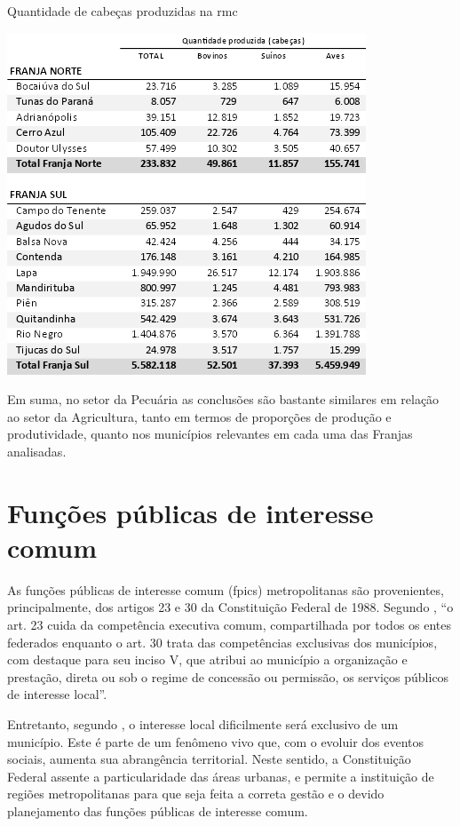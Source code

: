 	\begin{table}[h]
		\centering
		\caption{Quantidade de cabeças produzidas na \gls{rmc}}
		\includegraphics{img/rural_B}
		\label{tab:rural_B}
	\end{table}

	Em suma, no setor da Pecuária as conclusões são bastante similares em relação ao setor da Agricultura, tanto em termos de proporções de produção e produtividade, quanto nos municípios relevantes em cada uma das Franjas analisadas.

	\section{Funções públicas de interesse comum}
	
	As funções públicas de interesse comum (\gls{fpic}s) metropolitanas são provenientes, principalmente, dos artigos 23 e 30 da Constituição Federal de 1988. Segundo , ``o art. 23 cuida da competência executiva comum, compartilhada por todos os entes federados enquanto o art. 30 trata das competências exclusivas dos municípios, com destaque para seu inciso V, que atribui ao município a organização e prestação, direta ou sob o regime de concessão ou permissão, os serviços públicos de interesse local''.
	
	Entretanto, segundo \cite{barroso2007a}, o interesse local dificilmente será exclusivo de um município. Este é parte de um fenômeno vivo que, com o evoluir dos eventos sociais, aumenta sua abrangência territorial. Neste sentido, a Constituição Federal assente a particularidade das áreas urbanas, e permite a instituição de regiões metropolitanas para que seja feita a correta gestão e o devido planejamento das funções públicas de interesse comum.
	
